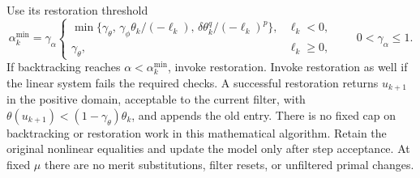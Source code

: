 \documentclass[pdflatex,sn-mathphys-num]{sn-jnl}
\theoremstyle{thmstyleone}
\theoremstyle{thmstylethree}
\newcounter{algorithm}
\begin{document}
Use its restoration threshold
\begin{equation}
 \alpha_k^{\min}=\gamma_\alpha
 \begin{cases}
 \min\{\gamma_\theta,\,
       \gamma_\phi\theta_k/(-\ell_k),\,
       \delta\theta_k^q/(-\ell_k)^p\},&\ell_k<0,\\
 \gamma_\theta,&\ell_k\geq0 ,
 \end{cases}
 \qquad 0<\gamma_\alpha\leq1 .
 \label{eq:filter-min-step}
\end{equation}
If backtracking reaches $\alpha<\alpha_k^{\min}$, invoke restoration.
Invoke restoration as well if the linear system fails the required checks.
A successful restoration returns $u_{k+1}$ in the positive domain,
acceptable to the current filter, with
$\theta(u_{k+1})<(1-\gamma_\theta)\theta_k$,
and appends the old entry.
There is no fixed cap on backtracking or restoration work in this
mathematical algorithm.
Retain the original nonlinear equalities and update the model only after
step acceptance. At fixed $\mu$ there are no merit substitutions, filter
resets, or unfiltered primal changes.
\end{document}
